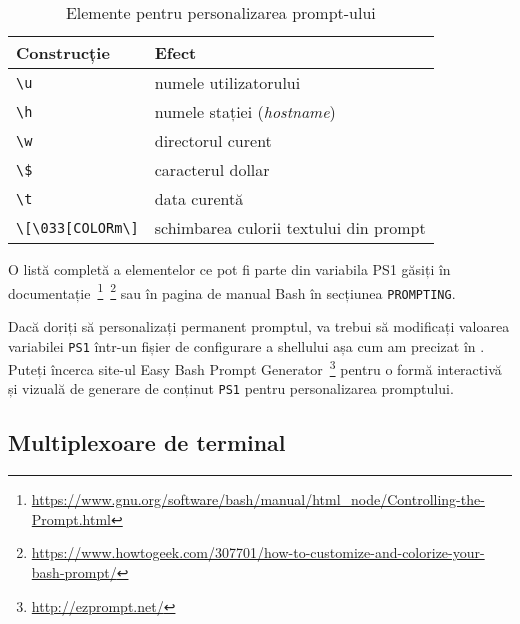 \begin{table}[!htb]
  \caption{Elemente pentru personalizarea prompt-ului}
  \begin{center}
    \begin{tabular}{ p{} p{} }
      \toprule
        \textbf{Construcție} &
        \textbf{Efect} \\
      \midrule

        \verb|\u| &
        numele utilizatorului \\

        \verb|\h| &
        numele stației (\textit{hostname}) \\

        \verb|\w| &
        directorul curent \\

        \verb|\$| &
        caracterul dollar \\

        \verb|\t| &
        data curentă \\

        \verb|\[\033[COLORm\]| &
        schimbarea culorii textului din prompt \\
      \bottomrule
    \end{tabular}
    \label{tab:cli:prompt}
  \end{center}
\end{table}

O listă completă a elementelor ce pot fi parte din variabila PS1 găsiți în
documentație~\footnote{\url{https://www.gnu.org/software/bash/manual/html_node/Controlling-the-Prompt.html}}~\footnote{\url{https://www.howtogeek.com/307701/how-to-customize-and-colorize-your-bash-prompt/}} sau în pagina de manual Bash în secțiunea \texttt{PROMPTING}.

Dacă doriți să personalizați permanent promptul, va trebui să modificați valoarea
variabilei \texttt{PS1} într-un fișier de configurare a shellului așa cum am precizat în . Puteți încerca site-ul Easy Bash Prompt
Generator~\footnote{\url{http://ezprompt.net/}} pentru o formă interactivă și vizuală de
generare de conținut \texttt{PS1} pentru personalizarea promptului.

\subsection{Multiplexoare de terminal}
\label{sec:cli:shell-start:mux}

